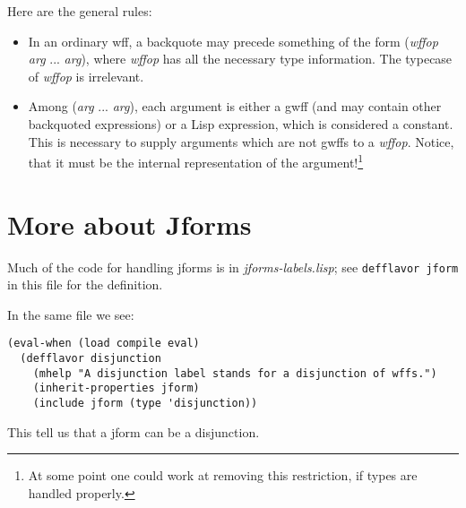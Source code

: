 Here are the general rules:
\begin{itemize}
\item In an ordinary wff, a backquote may precede something of the form
{\wt ({\it wffop} {\it arg} ... {\it arg})}, where {\it wffop} has all the necessary
type information.  The typecase of {\it wffop} is irrelevant.

\item Among {\wt ({\it arg} ... {\it arg})}, each argument is either a gwff (and may
contain other backquoted expressions) or a Lisp expression, which
is considered a constant.  This is necessary to supply arguments which
are not gwffs to a {\it wffop}.  Notice, that it must be the internal
representation of the argument!\footnote{At some point one could work at
removing this restriction, if types are handled properly.}
\end{itemize}

\section{More about Jforms}

Much of the code for handling jforms is in {\it jforms-labels.lisp}; see
{\tt defflavor jform} in this file for the definition.

In the same file we see:

\begin{verbatim}
(eval-when (load compile eval)
  (defflavor disjunction
    (mhelp "A disjunction label stands for a disjunction of wffs.")
    (inherit-properties jform)
    (include jform (type 'disjunction))
\end{verbatim}

This tell us that a jform can be a disjunction.




